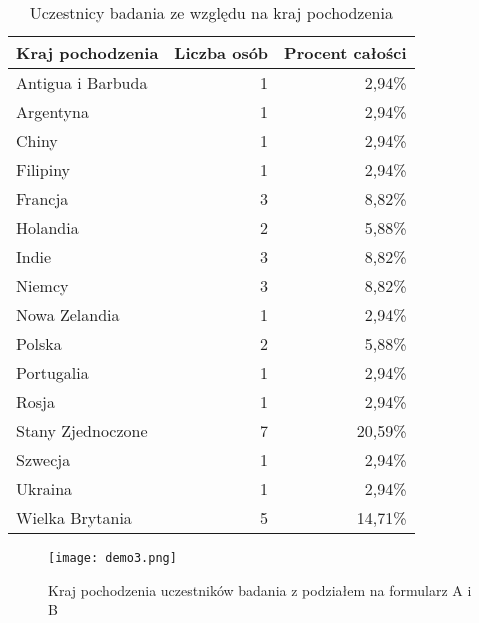 \begin{table}[h!]
    \begin{center}
        \begin{tabular}{|l|r|r|}
            \hline
            Kraj pochodzenia  & Liczba osób & Procent całości \\
            \hline
            Antigua i Barbuda & 1           & 2,94\%          \\
            Argentyna         & 1           & 2,94\%          \\
            Chiny             & 1           & 2,94\%          \\
            Filipiny          & 1           & 2,94\%          \\
            Francja           & 3           & 8,82\%          \\
            Holandia          & 2           & 5,88\%          \\
            Indie             & 3           & 8,82\%          \\
            Niemcy            & 3           & 8,82\%          \\
            Nowa Zelandia     & 1           & 2,94\%          \\
            Polska            & 2           & 5,88\%          \\
            Portugalia        & 1           & 2,94\%          \\
            Rosja             & 1           & 2,94\%          \\
            Stany Zjednoczone & 7           & 20,59\%         \\
            Szwecja           & 1           & 2,94\%          \\
            Ukraina           & 1           & 2,94\%          \\
            Wielka Brytania   & 5           & 14,71\%         \\
            \hline
        \end{tabular}
    \end{center}
    \caption{Uczestnicy badania ze względu na kraj pochodzenia}\label{tab1:ch7_3}
\end{table}

\begin{figure}[h!]
    \centering
    \texttt{[image: demo3.png]}
    \caption{Kraj pochodzenia uczestników badania z podziałem na formularz A i B}
    \label{fig:ch7_demo3}
\end{figure}

